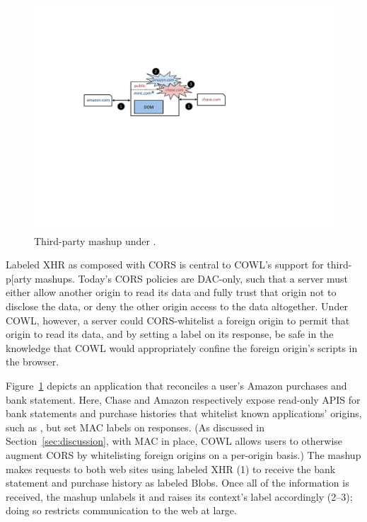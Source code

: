 \begin{figure}
\centerline{\includegraphics[width=\columnwidth]{mashup}}
\caption{\label{fig:mashup} Third-party mashup under \sys{}.}
\end{figure}
Labeled XHR as composed with CORS is central to COWL's support for
third-p[arty mashups.
%
Today's CORS policies are DAC-only, such that a server must either
allow another origin to read its data and fully trust that origin not
to disclose the data, or deny the other origin access to the data
altogether. Under COWL, however, a server could CORS-whitelist a
foreign origin to permit that origin to read its data, and by setting
a label on its response, be safe in the knowledge that COWL would
appropriately confine the foreign origin's scripts in the browser.
 
Figure~\ref{fig:mashup} depicts an application that reconciles a
user's Amazon purchases and bank statement.
%
Here, Chase and Amazon respectively expose read-only APIS for bank
statements and purchase histories that whitelist known applications'
origins, such as , but set MAC labels on responses.
%
(As discussed in Section~\ref{sec:discussion}, with MAC in place, COWL
allows users to otherwise augment CORS by whitelisting foreign origins
on a per-origin basis.)
%
%
The mashup makes requests to both web sites using labeled XHR (1)
to receive the bank statement and
purchase history as labeled Blobs.
%
Once all of the information is received, the mashup unlabels it and
raises its context's label accordingly (2--3); doing so restricts
communication to the web at large.

